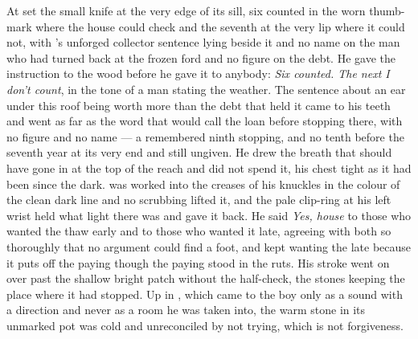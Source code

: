 At   set the small knife at the very edge of its sill, six counted in the worn thumb-mark where the house could check and the seventh at the very lip where it could not, with 's unforged collector sentence lying beside it and no name on the man who had turned back at the frozen ford and no figure on the debt. He gave the instruction to the wood before he gave it to anybody: \emph{Six counted. The next I don't count}, in the tone of a man stating the weather. The sentence about an ear under this roof being worth more than the debt that held it came to his teeth and went as far as the word that would call the loan before stopping there, with no figure and no name --- a remembered ninth stopping, and no tenth before the seventh year at its very end and still ungiven. He drew the breath that should have gone in at the top of the reach and did not spend it, his chest tight as it had been since the dark.  was worked into the creases of his knuckles in the colour of the clean dark line and no scrubbing lifted it, and the pale clip-ring at his left wrist held what light there was and gave it back. He said \emph{Yes, house} to those who wanted the thaw early and to those who wanted it late, agreeing with both so thoroughly that no argument could find a foot, and kept wanting the late because it puts off the paying though the paying stood in the ruts. His stroke went on over  past the shallow bright patch without the half-check, the stones keeping the place where it had stopped. Up in , which came to the boy only as a sound with a direction and never as a room he was taken into, the warm stone in its unmarked pot was cold and unreconciled by not trying, which is not forgiveness.

